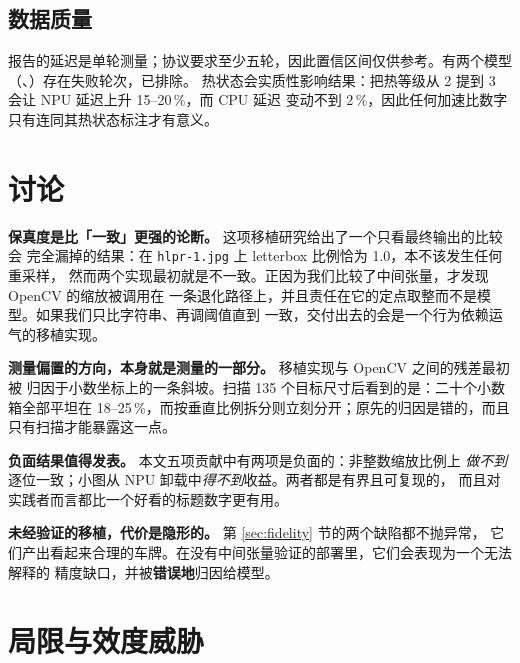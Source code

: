 \documentclass[UTF8,a4paper,11pt]{ctexart}
\begin{document}
\subsection{数据质量}

报告的延迟是单轮测量；协议要求至少五轮，因此置信区间仅供参考。有两个模型
（、）存在失败轮次，已排除。
热状态会实质性影响结果：把热等级从 2 提到 3 会让 NPU 延迟上升 15--20\,\%，而 CPU 延迟
变动不到 2\,\%，因此任何加速比数字只有连同其热状态标注才有意义。

\section{讨论}

\textbf{保真度是比「一致」更强的论断。} 这项移植研究给出了一个只看最终输出的比较会
完全漏掉的结果：在 \texttt{hlpr-1.jpg} 上 letterbox 比例恰为 1.0，本不该发生任何重采样，
然而两个实现最初就是不一致。正因为我们比较了中间张量，才发现 OpenCV 的缩放被调用在
一条退化路径上，并且责任在它的定点取整而不是模型。如果我们只比字符串、再调阈值直到
一致，交付出去的会是一个行为依赖运气的移植实现。

\textbf{测量偏置的方向，本身就是测量的一部分。} 移植实现与 OpenCV 之间的残差最初被
归因于小数坐标上的一条斜坡。扫描 135 个目标尺寸后看到的是：二十个小数箱全部平坦在
18--25\,\%，而按垂直比例拆分则立刻分开；原先的归因是错的，而且只有扫描才能暴露这一点。

\textbf{负面结果值得发表。} 本文五项贡献中有两项是负面的：非整数缩放比例上
\emph{做不到}逐位一致；小图从 NPU 卸载中\emph{得不到}收益。两者都是有界且可复现的，
而且对实践者而言都比一个好看的标题数字更有用。

\textbf{未经验证的移植，代价是隐形的。} 第 \ref{sec:fidelity} 节的两个缺陷都不抛异常，
它们产出看起来合理的车牌。在没有中间张量验证的部署里，它们会表现为一个无法解释的
精度缺口，并被\textbf{错误地}归因给模型。

\section{局限与效度威胁}
\end{document}

